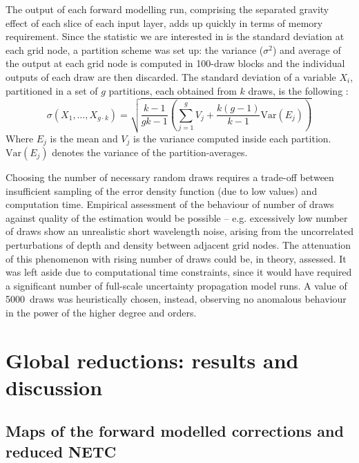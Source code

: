 The output of each forward modelling run, comprising the separated gravity effect of each slice of each input layer, adds up quickly in terms of memory requirement.
Since the statistic we are interested in is the standard deviation at each grid node, a partition scheme was set up: the variance ($\sigma^2$) and average of the output at each grid node is computed in \num{100}-draw blocks and the individual outputs of each draw are then discarded.
The standard deviation of a variable $X_i$, partitioned in a set of $g$ partitions, each obtained from $k$ draws, is the following \parencites{Chan1982}{Pebay2008}:
\begin{equation}
    \label{eq:StdAggregation}
    \sigma(X_1,\dots,X_{g \cdot k}) =
    \sqrt{
        \frac{k-1}{gk-1}
        \left(
            \sum_{j=1}^{g} V_j + \frac{k(g-1)}{k-1} \mathrm{Var}(E_j)
        \right)
    }
\end{equation}
Where $E_j$ is the mean and $V_j$ is the variance computed inside each partition.
$\mathrm{Var}(E_j)$ denotes the variance of the partition-averages.

Choosing the number of necessary random draws requires a trade-off between insufficient sampling of the error density function (due to low values) and computation time.
Empirical assessment of the behaviour of number of draws against quality of the estimation would be possible -- e.g. excessively low number of draws show an unrealistic short wavelength noise, arising from the uncorrelated perturbations of depth and density between adjacent grid nodes.
The attenuation of this phenomenon with rising number of draws could be, in theory, assessed.
It was left aside due to computational time constraints, since it would have required a significant number of full-scale uncertainty propagation model runs.
A value of \num{5000}~draws was heuristically chosen, instead, observing no anomalous behaviour in the power of the higher degree and orders.

\FloatBarrier

\section{Global reductions: results and discussion}
\label{s:SigIs:Results}

\subsection{Maps of the forward modelled corrections and reduced NETC}
\label{ss:SigIs:Results:Maps}

